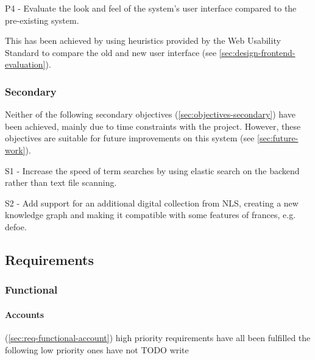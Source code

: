 \documentclass[12pt, letterpaper]{article}
\begin{document}
\begin{displayquote}
P4 - Evaluate the look and feel of the system’s user interface compared to the pre-existing system.
\end{displayquote}

\begin{flushleft}
This has been achieved by using heuristics provided by the Web Usability Standard \cite{web-usability} to compare the old and new user interface (see \ref{sec:design-frontend-evaluation}).
\end{flushleft}

\subsubsection{Secondary}\label{sec:evaluation-obj-secondary}

\begin{flushleft}
Neither of the following secondary objectives (\ref{sec:objectives-secondary}) have been achieved, mainly due to time constraints with the project. However, these objectives are suitable for future improvements on this system (see \ref{sec:future-work}).
\end{flushleft}

\begin{displayquote}
S1 - Increase the speed of term searches by using elastic search on the backend rather than text file scanning.
\end{displayquote}

\begin{displayquote}
S2 - Add support for an additional digital collection from NLS, creating a new knowledge graph and making it compatible with some features of frances, e.g. defoe.
\end{displayquote}

\subsection{Requirements}\label{sec:evaluation-requirements}

\subsubsection{Functional}

\paragraph{Accounts}

\begin{flushleft}
(\ref{sec:req-functional-account})
high priority requirements have all been fulfilled
the following low priority ones have not
TODO write
\end{flushleft}
\end{document}
